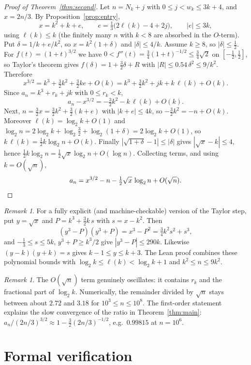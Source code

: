 \documentclass[11pt]{amsart}
\theoremstyle{remark}
\newtheorem{remark}[theorem]{Remark}
\begin{document}
\begin{proof}[Proof of Theorem~\ref{thm:second}]
Let $n=N_k+j$ with $0\le j<w_k\le3k+4$, and $x=2n/3$. By Proposition~\ref{prop:entry},
\[
  x=k^2+k+e,\qquad e=\tfrac13\bigl(2\ell(k)-4+2j\bigr),\qquad |e|\le3k,
\]
using $\ell(k)\le k$ (the finitely many $n$ with $k<8$ are absorbed in the $O$-term). Put $\delta=1/k+e/k^2$, so $x=k^2(1+\delta)$ and $|\delta|\le4/k$.
Assume $k\ge8$, so $|\delta|\le\frac12$. For $f(t)=(1+t)^{3/2}$ we have
$0<f''(t)=\tfrac34(1+t)^{-1/2}\le\tfrac34\sqrt2$ on $[-\tfrac12,\tfrac12]$, so Taylor's theorem gives
$f(\delta)=1+\tfrac32\delta+R$ with $|R|\le0.54\,\delta^2\le 9/k^2$. Therefore
\[
  x^{3/2}=k^3+\tfrac32k^2+\tfrac32ke+O(k)=k^3+\tfrac32k^2+jk+k\,\ell(k)+O(k).
\]
Since $a_n=k^3+r_k+jk$ with $0\le r_k<k$,
\[
  a_n-x^{3/2}=-\tfrac32k^2-k\,\ell(k)+O(k).
\]
Next, $n=\tfrac32x=\tfrac32k^2+\tfrac32(k+e)$ with $|k+e|\le4k$, so $-\tfrac32k^2=-n+O(k)$.
Moreover $\ell(k)=\log_2k+O(1)$ and $\log_2 n=2\log_2k+\log_2\tfrac32+\log_2(1+\delta)=2\log_2k+O(1)$,
so $k\,\ell(k)=\tfrac12k\log_2n+O(k)$. Finally $|\sqrt{1+\delta}-1|\le|\delta|$ gives
$|\sqrt x-k|\le4$, hence $\tfrac12k\log_2n=\tfrac12\sqrt x\log_2n+O(\log n)$. Collecting terms, and
using $k=O(\sqrt n)$,
\[
  a_n=x^{3/2}-n-\tfrac12\sqrt x\,\log_2n+O(\sqrt n).\qedhere
\]
\end{proof}

\begin{remark}\label{rem:alg}
For a fully explicit (and machine-checkable) version of the Taylor step, put $y=\sqrt x$ and
$P=k^3+\tfrac32k\,s$ with $s=x-k^2$. Then
\[
  (y^3-P)(y^3+P)=x^3-P^2=\tfrac34k^2s^2+s^3,
\]
and $-\tfrac13\le s\le5k$, $y^3+P\ge k^3/2$ give $|y^3-P|\le290k$. Likewise $(y-k)(y+k)=s$ gives
$k-1\le y\le k+3$. The Lean proof combines these polynomial bounds with
$\log_2k\le\ell(k)<\log_2k+1$ and $k^2\le n\le9k^2$.
\end{remark}

\begin{remark}
The $O(\sqrt n)$ term genuinely oscillates: it contains $r_k$ and the fractional part of
$\log_2k$. Numerically, the remainder divided by $\sqrt n$ stays between about $2.72$ and $3.18$
for $10^3\le n\le10^8$. The first-order statement explains the slow convergence of the ratio in
Theorem~\ref{thm:main}: $a_n/(2n/3)^{3/2}\approx1-\tfrac32(2n/3)^{-1/2}$, e.g.\ $0.99815$ at
$n=10^6$.
\end{remark}

\section{Formal verification}\label{sec:lean}
\end{document}
